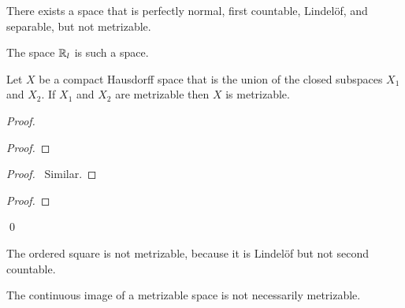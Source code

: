 \begin{example}
    There exists a space that is perfectly normal, first countable, Lindel\"{o}f,
    and separable, but not metrizable.

    The space $\mathbb{R}_l$ is such a space.
\end{example}

\begin{proposition}
    Let $X$ be a compact Hausdorff space that is the union of the closed
    subspaces $X_1$ and $X_2$. If $X_1$ and $X_2$ are metrizable then $X$
    is metrizable.
\end{proposition}

\begin{proof}
    \pf
    \begin{proof}
    \end{proof}
    \begin{proof}
        \pf\ Similar.
    \end{proof}
    \begin{proof}
    \end{proof}
    \qed
\end{proof}

\begin{example}
    The ordered square is not metrizable, because it is Lindel\"{o}f but not second countable.
\end{example}

\begin{proposition}
    The continuous image of a metrizable space is not necessarily metrizable.
\end{proposition}

